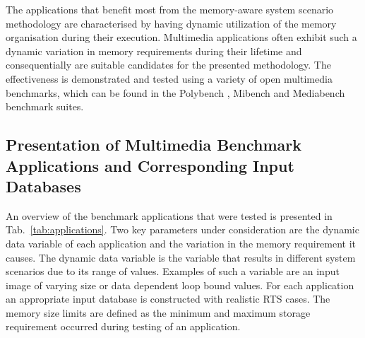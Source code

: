 \documentclass[a4paper,conference]{IEEEtran}
\begin{document}
The applications that benefit most from the memory-aware system scenario methodology are characterised by having dynamic utilization of the memory organisation during their execution. Multimedia applications often exhibit such a dynamic variation in memory requirements during their lifetime and consequentially are suitable candidates for the presented methodology. The effectiveness is demonstrated and tested using a variety of open multimedia benchmarks, which can be found in the Polybench \cite{Poly}, Mibench \cite{mibench} and Mediabench \cite{mediabench} benchmark suites. 

\subsection{Presentation of Multimedia Benchmark Applications and Corresponding Input Databases}

An overview of the benchmark applications that were tested is presented in Tab.~\ref{tab:applications}. Two key parameters under consideration are the dynamic data variable of each application and the variation in the memory requirement it causes. The dynamic data variable is the variable that results in different system scenarios due to its range of values. Examples of such a variable are an input image of varying size or data dependent loop bound values. For each application an appropriate input database is constructed with realistic RTS cases. The memory size limits are defined as the minimum and maximum storage requirement occurred during testing of an application.
\end{document}
